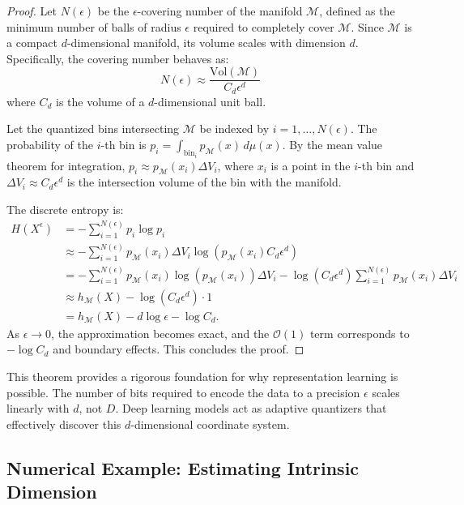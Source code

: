 \begin{proof}
Let $N(\epsilon)$ be the $\epsilon$-covering number of the manifold $\mathcal{M}$, defined as the minimum number of balls of radius $\epsilon$ required to completely cover $\mathcal{M}$. Since $\mathcal{M}$ is a compact $d$-dimensional manifold, its volume scales with dimension $d$. Specifically, the covering number behaves as:
\begin{equation}
    N(\epsilon) \approx \frac{\text{Vol}(\mathcal{M})}{C_d \epsilon^d}
\end{equation}
where $C_d$ is the volume of a $d$-dimensional unit ball. 

Let the quantized bins intersecting $\mathcal{M}$ be indexed by $i = 1, \dots, N(\epsilon)$. The probability of the $i$-th bin is $p_i = \int_{\text{bin}_i} p_{\mathcal{M}}(x) \, d\mu(x)$. By the mean value theorem for integration, $p_i \approx p_{\mathcal{M}}(x_i) \Delta V_i$, where $x_i$ is a point in the $i$-th bin and $\Delta V_i \approx C_d \epsilon^d$ is the intersection volume of the bin with the manifold.

The discrete entropy is:
\begin{align*}
    H(X^\epsilon) &= - \sum_{i=1}^{N(\epsilon)} p_i \log p_i \\
    &\approx - \sum_{i=1}^{N(\epsilon)} p_{\mathcal{M}}(x_i) \Delta V_i \log \left( p_{\mathcal{M}}(x_i) C_d \epsilon^d \right) \\
    &= - \sum_{i=1}^{N(\epsilon)} p_{\mathcal{M}}(x_i) \log(p_{\mathcal{M}}(x_i)) \Delta V_i - \log(C_d \epsilon^d) \sum_{i=1}^{N(\epsilon)} p_{\mathcal{M}}(x_i) \Delta V_i \\
    &\approx h_{\mathcal{M}}(X) - \log(C_d \epsilon^d) \cdot 1 \\
    &= h_{\mathcal{M}}(X) - d \log \epsilon - \log C_d.
\end{align*}
As $\epsilon \to 0$, the approximation becomes exact, and the $\mathcal{O}(1)$ term corresponds to $-\log C_d$ and boundary effects. This concludes the proof.
\end{proof}

This theorem provides a rigorous foundation for why representation learning is possible. The number of bits required to encode the data to a precision $\epsilon$ scales linearly with $d$, not $D$. Deep learning models act as adaptive quantizers that effectively discover this $d$-dimensional coordinate system.

\subsection{Numerical Example: Estimating Intrinsic Dimension}

